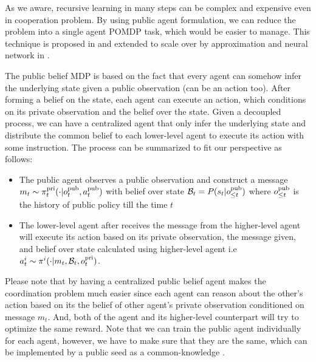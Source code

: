 \label{sec:chap5-pub-belief-MDP}
As we aware, recursive learning in many steps can be complex and expensive even in cooperation problem. By using public agent formulation, we can reduce the problem into a single agent POMDP task, which would be easier to manage. This technique is proposed in \cite{nayyar2013decentralized} and extended to scale over by approximation and neural network in \cite{foerster2018bayesian}. 

The public belief MDP is based on the fact that every agent can somehow infer the underlying state given a public observation (can be an action too). After forming a belief on the state, each agent can execute an action, which conditions on its private observation and the belief over the state. Given a decoupled process, we can have a centralized agent that only infer the underlying state and distribute the common belief to each lower-level agent to execute its action with some instruction. The process can be summarized to fit our perspective as follows:
\begin{itemize}
    \item The public agent observes a public observation and construct a message $m_t \sim \pi^{\operatorname{pri}}_t(\cdot | o^{\operatorname{pub}}_t, a^{\operatorname{pub}}_t)$ with belief over state $\mathcal{B}_t = P(s_t | o^{\operatorname{pub}}_{\le t})$ where $o^{\operatorname{pub}}_{\le t}$ is the history of public policy till the time $t$
    \item The lower-level agent after receives the message from the higher-level agent will execute its action based on its private observation, the message given, and belief over state calculated using higher-level agent i.e $a^i_t \sim \pi^i(\cdot | m_t, \mathcal{B}_t, o^{\operatorname{pri}}_t)$. 
\end{itemize}
Please note that by having a centralized public belief agent makes the coordination problem much easier since each agent can reason about the other's action based on its the belief of other agent's private observation conditioned on message $m_t$. And, both of the agent and its higher-level counterpart will try to optimize the same reward. Note that we can train the public agent individually for each agent, however, we have to make sure that they are the same, which can be implemented by a public seed as a common-knowledge \cite{foerster2018bayesian}.